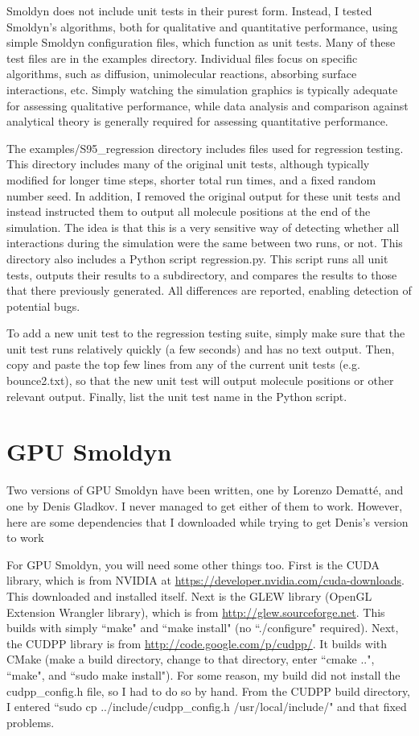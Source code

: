 \documentclass {scrbook}
\begin{document}
Smoldyn does not include unit tests in their purest form. Instead, I tested Smoldyn's algorithms, both for qualitative and quantitative performance, using simple Smoldyn configuration files, which function as unit tests. Many of these test files are in the examples directory. Individual files focus on specific algorithms, such as diffusion, unimolecular reactions, absorbing surface interactions, etc. Simply watching the simulation graphics is typically adequate for assessing qualitative performance, while data analysis and comparison against analytical theory is generally required for assessing quantitative performance.

The examples/S95\_regression directory includes files used for regression testing. This directory includes many of the original unit tests, although typically modified for longer time steps, shorter total run times, and a fixed random number seed. In addition, I removed the original output for these unit tests and instead instructed them to output all molecule positions at the end of the simulation. The idea is that this is a very sensitive way of detecting whether all interactions during the simulation were the same between two runs, or not. This directory also includes a Python script regression.py. This script runs all unit tests, outputs their results to a subdirectory, and compares the results to those that there previously generated. All differences are reported, enabling detection of potential bugs.

To add a new unit test to the regression testing suite, simply make sure that the unit test runs relatively quickly (a few seconds) and has no text output. Then, copy and paste the top few lines from any of the current unit tests (e.g. bounce2.txt), so that the new unit test will output molecule positions or other relevant output. Finally, list the unit test name in the Python script.

\section{GPU Smoldyn}

Two versions of GPU Smoldyn have been written, one by Lorenzo Dematt\'{e}, and one by Denis Gladkov. I never managed to get either of them to work. However, here are some dependencies that I downloaded while trying to get Denis's version to work

For GPU Smoldyn, you will need some other things too. First is the CUDA library, which is from NVIDIA at \url{https://developer.nvidia.com/cuda-downloads}. This downloaded and installed itself. Next is the GLEW library (OpenGL Extension Wrangler library), which is from \url{http://glew.sourceforge.net}. This builds with simply ``make" and ``make install" (no ``./configure" required). Next, the CUDPP library is from \url{http://code.google.com/p/cudpp/}. It builds with CMake (make a build directory, change to that directory, enter ``cmake ..", ``make", and ``sudo make install"). For some reason, my build did not install the cudpp\_config.h file, so I had to do so by hand. From the CUDPP build directory, I entered ``sudo cp ../include/cudpp\_config.h /usr/local/include/" and that fixed problems.
\end{document}
